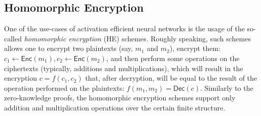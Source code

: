 \documentclass{iacrtrans}
\begin{document}



\subsection{Homomorphic Encryption}

One of the use-cases of activation efficient neural networks is the usage of the
so-called \textit{homomorphic encryption} (HE) schemes. Roughly speaking, such
schemes allows one to encrypt two plaintexts (say, $m_1$ and $m_2$), encrypt
them: $c_1 \gets \mathsf{Enc}(m_1), c_2 \gets \mathsf{Enc}(m_2)$, and then
perform some operations on the ciphertexts (typically, additions and
multiplications), which will result in the encryption $c=f(c_1,c_2)$ that, after
decryption, will be equal to the result of the operation performed on the
plaintexts: $f(m_1,m_2) = \mathsf{Dec}(c)$. Similarly to the zero-knowledge
proofs, the homomorphic encryption schemes support only addition and 
multiplication operations over the certain finite structure.
\end{document}
